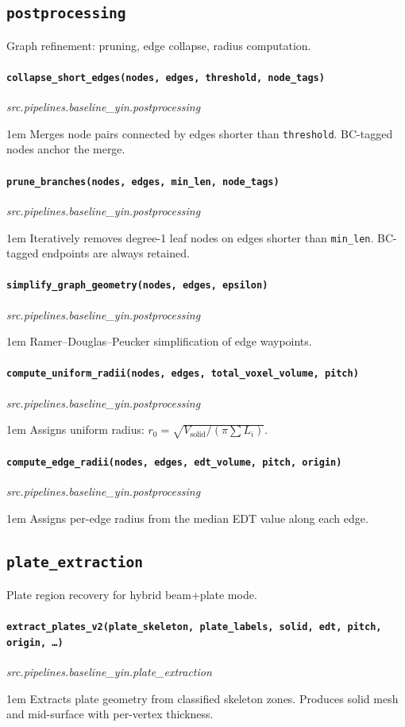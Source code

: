 \documentclass[a4paper, 11pt, openany]{report}
\newcommand{\apifunc}[2]{%
    \paragraph{\texttt{#2}}\hfill\textit{\small #1}\par\nopagebreak
}
\begin{document}
\subsection{\texttt{postprocessing}}

Graph refinement: pruning, edge collapse, radius computation.

\apifunc{src.pipelines.baseline\_yin.postprocessing}{collapse\_short\_edges(nodes, edges, threshold, node\_tags)}
\begin{adjustwidth}{1em}{}
Merges node pairs connected by edges shorter than \texttt{threshold}.
BC-tagged nodes anchor the merge.
\end{adjustwidth}

\apifunc{src.pipelines.baseline\_yin.postprocessing}{prune\_branches(nodes, edges, min\_len, node\_tags)}
\begin{adjustwidth}{1em}{}
Iteratively removes degree-1 leaf nodes on edges shorter than \texttt{min\_len}.
BC-tagged endpoints are always retained.
\end{adjustwidth}

\apifunc{src.pipelines.baseline\_yin.postprocessing}{simplify\_graph\_geometry(nodes, edges, epsilon)}
\begin{adjustwidth}{1em}{}
Ramer--Douglas--Peucker simplification of edge waypoints.
\end{adjustwidth}

\apifunc{src.pipelines.baseline\_yin.postprocessing}{compute\_uniform\_radii(nodes, edges, total\_voxel\_volume, pitch)}
\begin{adjustwidth}{1em}{}
Assigns uniform radius: $r_0 = \sqrt{V_{\text{solid}} / (\pi \sum L_i)}$.
\end{adjustwidth}

\apifunc{src.pipelines.baseline\_yin.postprocessing}{compute\_edge\_radii(nodes, edges, edt\_volume, pitch, origin)}
\begin{adjustwidth}{1em}{}
Assigns per-edge radius from the median EDT value along each edge.
\end{adjustwidth}


\subsection{\texttt{plate\_extraction}}

Plate region recovery for hybrid beam+plate mode.

\apifunc{src.pipelines.baseline\_yin.plate\_extraction}{extract\_plates\_v2(plate\_skeleton, plate\_labels, solid, edt, pitch, origin, \ldots)}
\begin{adjustwidth}{1em}{}
Extracts plate geometry from classified skeleton zones.  Produces solid mesh
and mid-surface with per-vertex thickness.
\end{adjustwidth}
\end{document}
